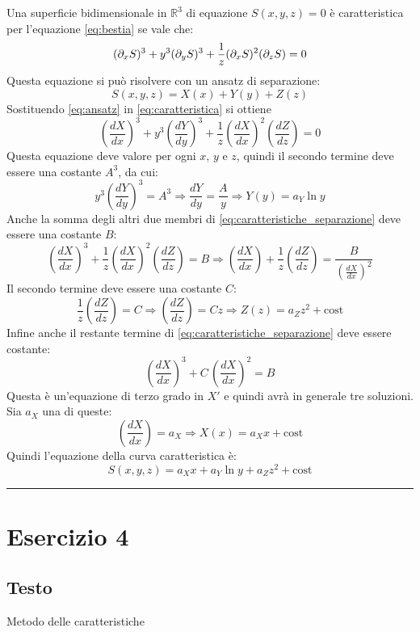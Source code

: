 \documentclass[]{scrartcl}
\newcommand{\qedsymbol}{\hfill \rule{0.7em}{0.7em}}
\newcommand{\px}{\partial_x}
\newcommand{\py}{\partial_y}
\begin{document}
\noindent
Una superficie bidimensionale in $ \mathbb{R}^3 $ di equazione $ S(x,y,z) = 0 $ è caratteristica per l'equazione \eqref{eq:bestia} se vale che:
\begin{equation}
	(\px S)^3 + y^3(\py S)^3 + \frac{1}{z}(\px S)^2(\partial_z S\\) = 0
	\label{eq:caratteristica}
\end{equation}
Questa equazione si può risolvere con un ansatz di separazione: 
\begin{equation}
	 S(x,y,z) = X(x) + Y(y) + Z(z) 
	\label{eq:ansatz}
\end{equation}
Sostituendo \eqref{eq:ansatz} in \eqref{eq:caratteristica} si ottiene
\begin{equation}
\left(\frac{dX}{dx}\right)^3 + y^3 \left(\frac{dY}{dy}\right)^3 + \frac{1}{z}\left(\frac{dX}{dx}\right)^2\left(\frac{dZ}{dz}\right) = 0 
\label{eq:caratteristiche_separazione}
\end{equation} 
Questa equazione deve valore per ogni $ x,\,y $ e $ z $, quindi il secondo termine deve essere una costante $ A^3 $, da cui:
\[	y^3 \left(\frac{dY}{dy}\right)^3 = A^3 \Rightarrow \frac{dY}{dy} = \frac{A}{y} \Rightarrow Y(y) = a_Y \ln y	\]
Anche la somma degli altri due membri di \eqref{eq:caratteristiche_separazione} deve essere una costante $ B $:
\[ \left(\frac{dX}{dx}\right)^3 + \frac{1}{z}\left(\frac{dX}{dx}\right)^2\left(\frac{dZ}{dz}\right) = B \Rightarrow \left(\frac{dX}{dx}\right) + \frac{1}{z}\left(\frac{dZ}{dz}\right) = \frac{B}{\left(\frac{dX}{dx}\right)^2}	\]
Il secondo termine deve essere una costante $ C $:
\[ \frac{1}{z}\left(\frac{dZ}{dz}\right) = C \Rightarrow \left(\frac{dZ}{dz}\right) = Cz \Rightarrow Z(z) = a_Z z^2 + \mathrm{cost}	\]
Infine anche il restante termine di \eqref{eq:caratteristiche_separazione} deve essere costante:
\[ \left(\frac{dX}{dx}\right)^3 + C\,\left(\frac{dX}{dx}\right)^2= B  \]
Questa è un'equazione di terzo grado in $ X' $ e quindi avrà in generale tre soluzioni. Sia $ a_X $ una di queste:
\[ \left(\frac{dX}{dx}\right) = a_X \Rightarrow X(x) = a_X x + \mathrm{cost} \]
Quindi l'equazione della curva caratteristica è:
\[ S(x,y,z) = a_X x	+ a_Y \ln y + a_Z z^2 + \mathrm{cost}	\]
\qedsymbol
\section*{Esercizio 4}

\subsection*{Testo} Metodo delle caratteristiche
\end{document}
